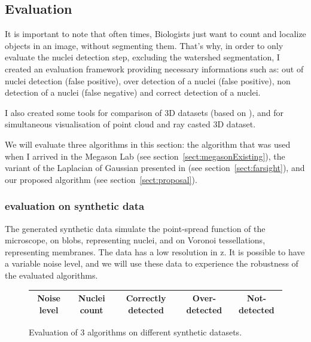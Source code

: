 \subsection{Evaluation}

It is important to note that often times, Biologists just want to count and localize objects in an image, without segmenting them.
That's why, in order to only evaluate the nuclei detection step, excluding the watershed segmentation, I created an evaluation framework providing necessary informations such as:
 out of nuclei detection (false positive), over detection of a nuclei (false positive), non detection of a nuclei (false negative) and correct detection of a nuclei.

I also created some tools for comparison of 3D datasets (based on {\gofigure}), and for simultaneous visualisation of point cloud and ray casted 3D dataset.

We will evaluate three algorithms in this section:
the algorithm that was used when I arrived in the Megason Lab (see section~\ref{sect:megasonExisting}),
the variant of the Laplacian of Gaussian presented in \cite{al2009improved} (see section~\ref{sect:farsight}),
and our proposed algorithm (see section~\ref{sect:proposal}).


\subsubsection{evaluation on synthetic data}

The generated synthetic data simulate the point-spread function of the microscope, on blobs, representing nuclei, and on Voronoi tessellations, representing membranes.
The data has a low resolution in z.
It is possible to have a variable noise level, and we will use these data to experience the robustness of the evaluated algorithms.

\begin{figure}[htb]
\begin{center}
\begin{tabular}{|c|c|c|c|c|}
\hline Noise level & Nuclei count & Correctly detected & Over-detected & Not-detected \\ 
\hline
\end{tabular} 
\end{center}
\caption{Evaluation of 3 algorithms on different synthetic datasets.}
\label{tab:DataSizes}
\end{figure}

